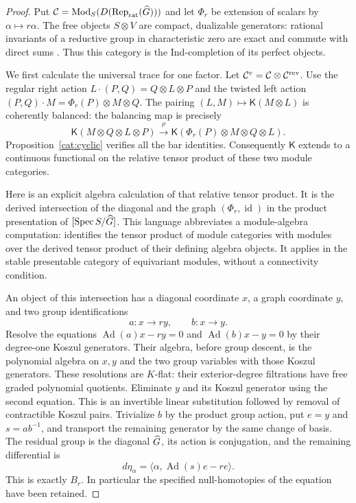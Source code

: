 \begin{proof}
Put $\mathcal C=\operatorname{Mod}_S
(D(\operatorname{Rep}_{\rm rat}(\widehat G)))$ and let $\Phi_r$
be extension of scalars by $\alpha\mapsto r\alpha$.
The free objects $S\otimes V$ are compact, dualizable
generators: rational invariants of a reductive group in
characteristic zero are exact and commute with direct sums
\cite[Remark~15.13 and Proposition~15.16]{MilneAlgebraicGroups}.
Thus this category is the Ind-completion of its perfect
objects.

We first calculate the universal trace for one factor.
Let $\mathcal C^e=\mathcal C\otimes\mathcal C^{\rm rev}$.
Use the regular right action
$L\cdot(P,Q)=Q\otimes L\otimes P$ and the twisted left
action $(P,Q)\cdot M=\Phi_r(P)\otimes M\otimes Q$.
The pairing $(L,M)\mapsto\mathsf K(M\otimes L)$ is
coherently balanced: the balancing map is precisely
\[
 \mathsf K(M\otimes Q\otimes L\otimes P)
 \xrightarrow{\rho}
 \mathsf K(\Phi_r(P)\otimes M\otimes Q\otimes L).
\]
Proposition~\ref{cat:cyclic} verifies all the bar identities.
Consequently $\mathsf K$ extends to a continuous functional
on the relative tensor product of these two module
categories.

Here is an explicit algebra calculation of that relative
tensor product. It is the derived intersection of the
diagonal and the graph $(\Phi_r,\operatorname{id})$ in the
product presentation of $[\operatorname{Spec}S/\widehat G]$.
This language abbreviates a module-algebra computation:
\cite[Proposition~4.1]{BFN} identifies the tensor product of
module categories with modules over the derived tensor
product of their defining algebra objects. It applies in
the stable presentable category of equivariant modules,
without a connectivity condition.

An object of this intersection has a diagonal coordinate
$x$, a graph coordinate $y$, and two group identifications
\[
 a:x\longrightarrow r y,
 \qquad b:x\longrightarrow y.
\]
Resolve the equations
$\operatorname{Ad}(a)x-r y=0$ and
$\operatorname{Ad}(b)x-y=0$ by their degree-one Koszul
generators. Their algebra, before group descent, is the
polynomial algebra on $x,y$ and the two group variables
with those Koszul generators. These resolutions are
$K$-flat: their exterior-degree filtrations have free
graded polynomial quotients. Eliminate $y$ and its
Koszul generator using the second equation. This is an
invertible linear substitution followed by removal of
contractible Koszul pairs. Trivialize $b$ by the product
group action, put $e=y$ and $s=a b^{-1}$, and transport
the remaining generator by the same change of basis.
The residual group is the diagonal $\widehat G$, its action is
conjugation, and the remaining differential is
\[
 d\eta_\alpha=
       \langle\alpha,\operatorname{Ad}(s)e-r e\rangle.
\]
This is exactly $B_r$. In particular the specified
null-homotopies of the equation have been retained.


\end{proof}

